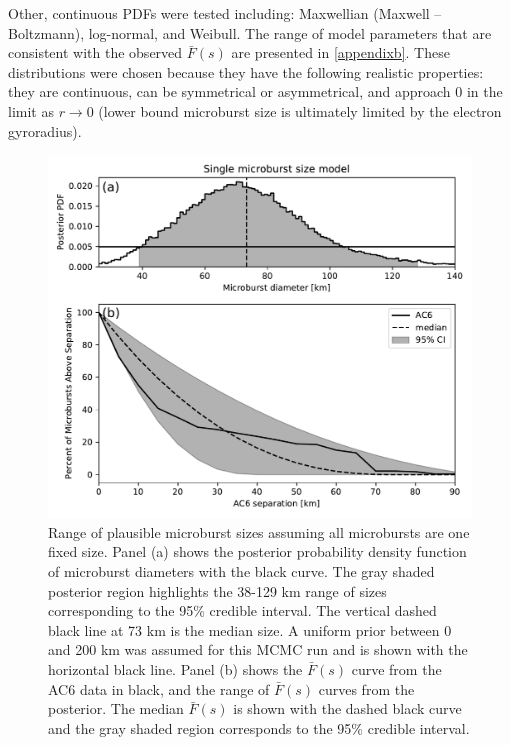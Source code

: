 \documentclass[draft]{agujournal2019}
\begin{document}
Other, continuous PDFs were tested including: Maxwellian (Maxwell -- Boltzmann), log-normal, and Weibull. The range of model parameters that are consistent with the observed $\bar{F}(s)$ are presented in \ref{appendixb}. These distributions were chosen because they have the following realistic properties: they are continuous, can be symmetrical or asymmetrical, and approach 0 in the limit as $r \rightarrow 0$ (lower bound microburst size is ultimately limited by the electron gyroradius).

\begin{figure}
\includegraphics[width=\textwidth]{fig6.pdf}
\caption{Range of plausible microburst sizes assuming all microbursts are one fixed size. Panel (a) shows the posterior probability density function of microburst diameters with the black curve. The gray shaded posterior region highlights the 38-129 km range of sizes corresponding to the 95\% credible interval. The vertical dashed black line at 73 km is the median size. A uniform prior between 0 and 200 km was assumed for this MCMC run and is shown with the horizontal black line. Panel (b) shows the $\bar{F}(s)$ curve from the AC6 data in black, and the range of $\bar{F}(s)$ curves from the posterior. The median $\bar{F}(s)$ is shown with the dashed black curve and the gray shaded region corresponds to the 95\% credible interval.} 
\label{fig6}
\end{figure}
\end{document}
